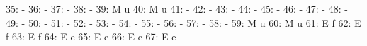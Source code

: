 \documentclass[nojss]{jss}
\begin{document}
\begin{Schunk}
\begin{Soutput}
 35:                                                                          -
 36:                                                                          -
 37:                                                                          -
 38:                                                                          -
 39:                                          M                               u
 40:                                          M                               u
 41:                                                                          -
 42:                                                                          -
 43:                                                                          -
 44:                                                                          -
 45:                                                                          -
 46:                                                                          -
 47:                                                                          -
 48:                                                                          -
 49:                                                                          -
 50:                                                                          -
 51:                                                                          -
 52:                                                                          -
 53:                                                                          -
 54:                                                                          -
 55:                                                                          -
 56:                                                                          -
 57:                                                                          -
 58:                                                                          -
 59:                                          M                               u
 60:                                          M                               u
 61:                                          E                               f
 62:                                          E                               f
 63:                                          E                               f
 64:                                          E                               e
 65:                                          E                               e
 66:                                          E                               e
 67:                                          E                               e

\end{Soutput}
\end{Schunk}
\end{document}

